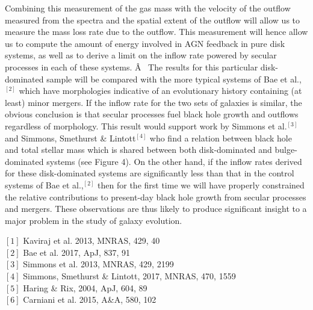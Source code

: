 \documentclass[12pt]{article}
\begin{document}
Combining this measurement of the gas mass with the velocity of the outflow measured from the spectra and the spatial extent of the outflow will allow us to measure the mass loss rate due to the outflow. This measurement will hence allow us to compute the amount of energy involved in AGN feedback in pure disk systems, as well as to derive a limit on the inflow rate powered by secular processes in each of these systems. 
\vspace{0.25em}
Â 
The results for this particular disk-dominated sample will be compared with the more typical systems of Bae et al.,$^{[2]}$ which have morphologies indicative of an evolutionary history containing (at least) minor mergers. If the inflow rate for the two sets of galaxies is similar, the obvious conclusion is that secular processes fuel black hole growth and outflows regardless of morphology. This result would support work by Simmons et al.$^{[3]}$ and Simmons, Smethurst \& Lintott$^{[4]}$ who find a relation between black hole and total stellar mass which is shared between both disk-dominated and bulge-dominated systems (see Figure 4). On the other hand, if the inflow rates derived for these disk-dominated systems are significantly less than that in the control systems of Bae et al.,$^{[2]}$ then for the first time we will have properly constrained the relative contributions to present-day black hole growth from secular processes and mergers. These observations are thus likely to produce significant insight to a major problem in the study of galaxy evolution. 
\vspace{1.5em}

\newpage

\vspace{0.5em}


\noindent
$[1]$ Kaviraj et al. 2013, MNRAS, 429, 40
\\
$[2]$ Bae et al. 2017, ApJ, 837, 91
\\
$[3]$ Simmons et al. 2013, MNRAS, 429, 2199 
\\
$[4]$ Simmons, Smethurst \& Lintott, 2017, MNRAS, 470, 1559
\\
$[5]$ Haring \& Rix, 2004, ApJ, 604, 89
\\
$[6]$ Carniani et al. 2015, A\&A, 580, 102
\end{document}
